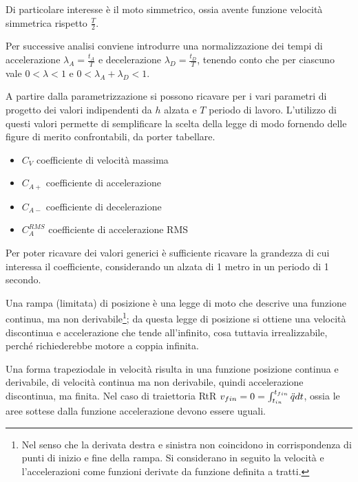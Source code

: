 Di particolare interesse è il moto simmetrico, ossia avente funzione velocità simmetrica rispetto \(\frac{T}{2}\).

Per successive analisi conviene introdurre una normalizzazione dei tempi di accelerazione \(\lambda_A = \frac{t_A}{T}\) e decelerazione \(\lambda_D = \frac{t_D}{T}\), tenendo conto che per ciascuno vale \(0 < \lambda < 1\) e \(0 < \lambda_A + \lambda_D < 1\).

A partire dalla parametrizzazione si possono ricavare per i vari parametri di progetto dei valori indipendenti da \(h\) alzata e \(T\) periodo di lavoro.
L'utilizzo di questi valori permette di semplificare la scelta della legge di modo fornendo delle figure di merito confrontabili, da porter tabellare.
\begin{itemize}
    \item \(C_V\) coefficiente di velocità massima
    \item \(C_{A+}\) coefficiente di accelerazione
    \item \(C_{A-}\) coefficiente di decelerazione
    \item \(C_A^{RMS}\) coefficiente di accelerazione RMS
\end{itemize}
Per poter ricavare dei valori generici è sufficiente ricavare la grandezza di cui interessa il coefficiente, considerando un alzata di 1 metro in un periodo di 1 secondo.

Una rampa (limitata) di posizione è una legge di moto che descrive una funzione continua, ma non derivabile\footnote{Nel senso che la derivata destra e sinistra non coincidono in corrispondenza di punti di inizio e fine della rampa. Si considerano in seguito la velocità e l'accelerazioni come funzioni derivate da funzione definita a tratti.}; da questa legge di posizione si ottiene una velocità discontinua e accelerazione che tende all'infinito, cosa tuttavia irrealizzabile, perché richiederebbe motore a coppia infinita.

Una forma trapeziodale in velocità risulta in una funzione posizione continua e derivabile, di velocità continua ma non derivabile, quindi accelerazione discontinua, ma finita.
Nel caso di traiettoria RtR \( v_{fin} = 0 = \int^{t_{fin}}_{t_{in}} \Ddot{q} dt \), ossia le aree sottese dalla funzione accelerazione devono essere uguali.


